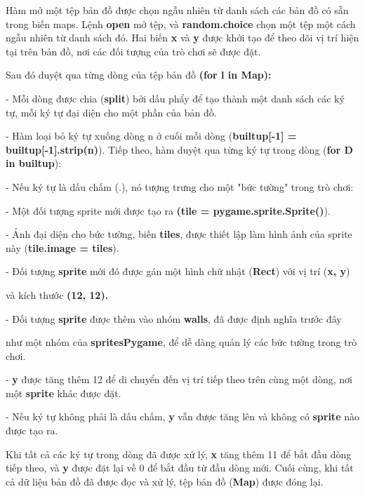 \documentclass[a4paper]{article}
\begin{document}
Hàm mở một tệp bản đồ được chọn ngẫu nhiên từ danh sách các bản đồ có
sẵn trong biến maps. Lệnh \textbf{open} mở tệp, và \textbf{random.choice} chọn
một tệp một cách ngẫu nhiên từ danh sách đó. Hai biến \textbf{x} và
\textbf{y} được khởi tạo để theo dõi vị trí hiện tại trên bản đồ, nơi
các đối tượng của trò chơi sẽ được đặt.

Sau đó duyệt qua từng dòng của tệp bản đồ \textbf{(for l in Map):}

- Mỗi dòng được chia (\textbf{split}) bởi dấu phẩy để tạo thành một danh
sách các ký tự, mỗi ký tự đại diện cho một phần của bản đồ.

- Hàm loại bỏ ký tự xuống dòng n ở cuối mỗi dòng
(\textbf{builtup{[}-1{]} = builtup{[}-}\textbf{1{]}.strip(\textquotesingle n\textquotesingle)}). Tiếp theo, hàm duyệt qua từng ký tự trong dòng (\textbf{for D in builtup}):

- Nếu ký tự là dấu chấm (.), nó tượng trưng cho một "bức tường" trong
trò chơi: 

- Một đối tượng sprite mới được tạo ra \textbf{(tile =
pygame.sprite.Sprite()}).

- Ảnh đại diện cho bức tường, biến \textbf{tiles}, được thiết lập làm
hình ảnh của sprite này (\textbf{tile.image = tiles}).

- Đối tượng \textbf{sprite} mới đó được gán một hình chữ nhật
(\textbf{Rect}) với vị trí (\textbf{x, y})

và kích thước \textbf{(12, 12).}

- Đối tượng \textbf{sprite} được thêm vào nhóm \textbf{walls}, đã được
định nghĩa trước đây

như một nhóm của \textbf{spritesPygame}, để dễ dàng quản lý các bức
tường trong trò chơi.

- \textbf{y} được tăng thêm 12 để di chuyển đến vị trí tiếp theo trên
cùng một dòng, nơi một \textbf{sprite} khác được đặt.

- Nếu ký tự không phải là dấu chấm, \textbf{y} vẫn được tăng lên và
không có \textbf{sprite} nào được tạo ra.

Khi tất cả các ký tự trong dòng đã được xử lý, \textbf{x} tăng thêm 11
để bắt đầu dòng tiếp theo, và \textbf{y} được đặt lại về 0 để bắt đầu từ
đầu dòng mới. Cuối cùng, khi tất cả dữ liệu bản đồ đã được đọc và xử lý,
tệp bản đồ (\textbf{Map}) được đóng lại.
\end{document}
